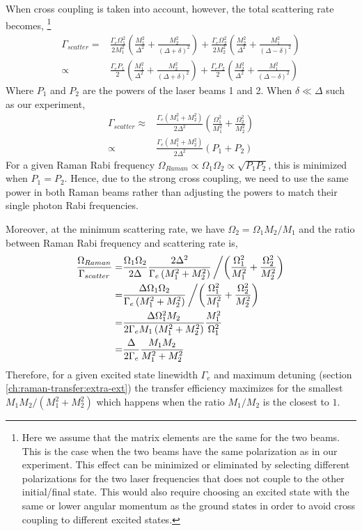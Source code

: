 When cross coupling is taken into account, however, the total scattering rate becomes,
\footnote{Here we assume that the matrix elements are the same for the two beams.
  This is the case when the two beams have the same polarization as in our experiment.
  This effect can be minimized or eliminated by selecting different polarizations for the
  two laser frequencies that does not couple to the other initial/final state.
  This would also require choosing an excited state with the same or lower angular momentum
  as the ground states in order to avoid cross coupling to different excited states.}
\begin{align}
  \Gamma_{scatter}=&\frac{\Gamma_e\Omega_1^2}{2M_1^2}\left(\frac{M_1^2}{\Delta^2}+\frac{M_2^2}{(\Delta+\delta)^2}\right)+\frac{\Gamma_e\Omega_2^2}{2M_2^2}\left(\frac{M_2^2}{\Delta^2}+\frac{M_1^2}{(\Delta-\delta)^2}\right)\\
  \propto&\frac{\Gamma_eP_1}{2}\left(\frac{M_1^2}{\Delta^2}+\frac{M_2^2}{(\Delta+\delta)^2}\right)+\frac{\Gamma_eP_2}{2}\left(\frac{M_2^2}{\Delta^2}+\frac{M_1^2}{(\Delta-\delta)^2}\right)
\end{align}
Where $P_1$ and $P_2$ are the powers of the laser beams 1 and 2.
When $\delta\ll\Delta$ such as our experiment,
\begin{align*}
  \Gamma_{scatter}\approx&\frac{\Gamma_e\left(M_1^2+M_2^2\right)}{2\Delta^2}\left(\frac{\Omega_1^2}{M_1^2}+\frac{\Omega_2^2}{M_2^2}\right)\\
  \propto&\frac{\Gamma_e\left(M_1^2+M_2^2\right)}{2\Delta^2}\left(P_1+P_2\right)
\end{align*}
For a given Raman Rabi frequency $\Omega_{Raman}\propto\Omega_1\Omega_2\propto\sqrt{P_1P_2}$,
this is minimized when $P_1=P_2$.
Hence, due to the strong cross coupling, we need to use the same power in both Raman beams
rather than adjusting the powers to match their single photon Rabi frequencies.

Moreover, at the minimum scattering rate, we have $\Omega_2=\Omega_1M_2/M_1$
and the ratio between Raman Rabi frequency and scattering rate is,
\begin{align*}
  \frac{\Omega_{Raman}}{\Gamma_{scatter}}=&\frac{\Omega_1\Omega_2}{2\Delta}\frac{2\Delta^2}{\Gamma_e\left(M_1^2+M_2^2\right)}\left/\left(\frac{\Omega_1^2}{M_1^2}+\frac{\Omega_2^2}{M_2^2}\right)\right.\\
  =&\frac{\Delta\Omega_1\Omega_2}{\Gamma_e\left(M_1^2+M_2^2\right)}\left/\left(\frac{\Omega_1^2}{M_1^2}+\frac{\Omega_2^2}{M_2^2}\right)\right.\\
  =&\frac{\Delta\Omega_1^2M_2}{2\Gamma_eM_1\left(M_1^2+M_2^2\right)}\frac{M_1^2}{\Omega_1^2}\\
  =&\frac{\Delta}{2\Gamma_e}\frac{M_1M_2}{M_1^2+M_2^2}
\end{align*}
Therefore, for a given excited state linewidth $\Gamma_e$
and maximum detuning (section \ref{ch:raman-transfer:extra-ext}) the transfer efficiency
maximizes for the smallest $M_1M_2/(M_1^2+M_2^2)$ which happens when the ratio
$M_1/M_2$ is the closest to $1$.

